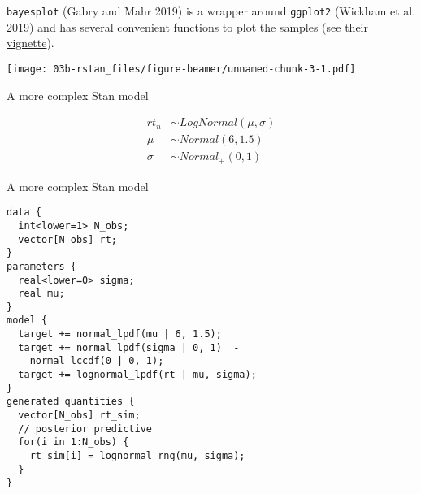 \documentclass[12pt,ignorenonframetext,aspectratio=169]{beamer}
\newenvironment{Shaded}{\begin{snugshade}}{\end{snugshade}}
\newcommand{\CommentTok}[1]{\textcolor[rgb]{0.56,0.35,0.01}{\textit{#1}}}
\newcommand{\DataTypeTok}[1]{\textcolor[rgb]{0.13,0.29,0.53}{#1}}
\newcommand{\KeywordTok}[1]{\textcolor[rgb]{0.13,0.29,0.53}{\textbf{#1}}}
\newcommand{\NormalTok}[1]{#1}
\newcommand{\OperatorTok}[1]{\textcolor[rgb]{0.81,0.36,0.00}{\textbf{#1}}}
\newcommand{\StringTok}[1]{\textcolor[rgb]{0.31,0.60,0.02}{#1}}
\begin{document}
\begin{frame}[fragile]

\texttt{bayesplot} (Gabry and Mahr 2019) is a wrapper around \texttt{ggplot2} (Wickham et al. 2019) and has several convenient functions to plot the samples (see their \href{https://mc-stan.org/bayesplot/articles/plotting-mcmc-draws.html}{vignette}).

\scriptsize

\begin{Shaded}
\end{Shaded}

\texttt{[image: 03b-rstan\_files/figure-beamer/unnamed-chunk-3-1.pdf]}

\normalsize

\end{frame}

\begin{frame}{A more complex Stan model}
\protect\hypertarget{a-more-complex-stan-model}{}

\begin{equation}
\begin{aligned}
rt_n &\sim LogNormal(\mu, \sigma)\\
\mu &\sim Normal(6, 1.5) \\
\sigma &\sim Normal_+(0, 1) 
\end{aligned}
\label{eq:infrtpriors}
\end{equation}

\end{frame}

\begin{frame}[fragile]{A more complex Stan model}
\protect\hypertarget{a-more-complex-stan-model-1}{}

\scriptsize

\begin{verbatim}
data {
  int<lower=1> N_obs;
  vector[N_obs] rt;
}
parameters {
  real<lower=0> sigma;
  real mu;
}
model {
  target += normal_lpdf(mu | 6, 1.5);
  target += normal_lpdf(sigma | 0, 1)  -
    normal_lccdf(0 | 0, 1);
  target += lognormal_lpdf(rt | mu, sigma); 
}
generated quantities {
  vector[N_obs] rt_sim;
  // posterior predictive
  for(i in 1:N_obs) {
    rt_sim[i] = lognormal_rng(mu, sigma);
  }
}
\end{verbatim}

\normalsize

\end{frame}
\end{document}
